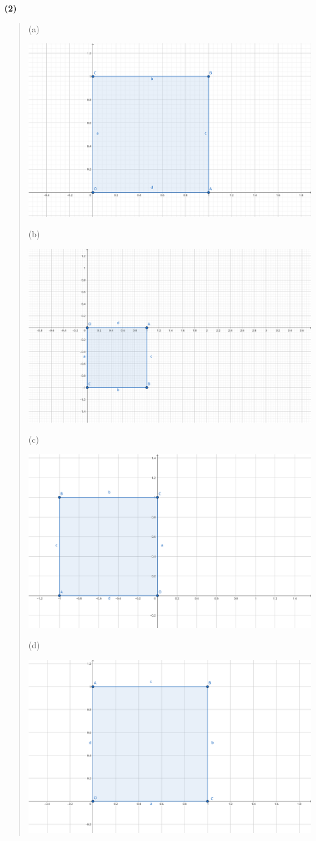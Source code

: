\documentclass{article}
\begin{document}
\textsf{\textbf{(2)}}
\begin{quote}
    (a)
    
    \includegraphics[width=0.70\linewidth]{geogebra-export.png}

    (b)

    \includegraphics[width=0.70\linewidth]{geogebra-export(1).png}

    (c)

    \includegraphics[width=0.75\linewidth]{geogebra-export(2).png}

    (d)

    \includegraphics[width=0.75\linewidth]{geogebra-export(3).png}


\end{quote}
\end{document}
